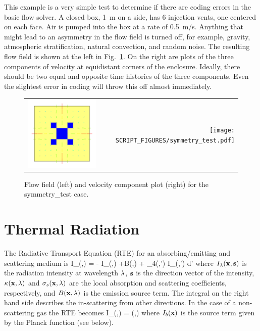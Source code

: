 \documentclass[11pt]{book}
\begin{document}
This example is a very simple test to determine if there are coding errors in the basic flow solver. A closed box, 1~m on a side, has 6 injection vents, one centered on each face.
Air is pumped into the box at a rate of 0.5~m/s. Anything that might lead to an asymmetry in the flow field is turned off, for example, gravity, atmospheric stratification,
natural convection, and random noise. The resulting flow field is shown at the left in Fig.~\ref{symmetry_test}. On the right are plots of the three components of velocity
at equidistant corners of the enclosure. Ideally, there should be two equal and opposite time histories of the three components. Even the slightest error in coding will throw
this off almost immediately.


\begin{figure}[ht]
\begin{tabular*}{\textwidth}{lr}
\includegraphics[width=3.2in]{SCRIPT_FIGURES/symmetry_test.png} &
\texttt{[image: SCRIPT\_FIGURES/symmetry\_test.pdf]}
\end{tabular*}
\caption[The {\bf symmetry\_test} case.]{Flow field (left) and velocity component plot (right) for the symmetry\_test case.}
\label{symmetry_test}
\end{figure}



\chapter{Thermal Radiation}

The Radiative Transport Equation (RTE) for an absorbing/emitting
and scattering medium is
\be \bs \cdot \nabla I_{\la}(\bx,\bs) =
 - \;
I_\la(\bx,\bs) +B(\bx,\la) + 
\int_{4\pi}\Phi(\bs,\bs') \; I_{\la}(\bx,\bs') \; d\bs'
\label{RTEbasic} \ee
where $I_{\lambda}({\bf x},{\bf s})$ is the radiation intensity at wavelength
$\lambda$, ${\bf s}$ is the direction vector of the intensity,
$\kappa({\bf x},\lambda)$ and $\sigma_s({\bf x},\lambda)$ are the local absorption
and scattering coefficients,
respectively, and $B({\bf x},\lambda)$ is the emission source term.
The integral on the
right hand side describes the in-scattering from other directions.
In the case of a non-scattering gas the RTE becomes
\be \bs \cdot \nabla I_{\la}(\bx,\bs) = \kappa(\bx,\la) \; \Big[ I_b(\bx)
- I_\la(\bx,\bs) \Big] \label{RTE} \ee
where $I_b({\bf x})$ is the source term given by the Planck function (see below).
\end{document}
